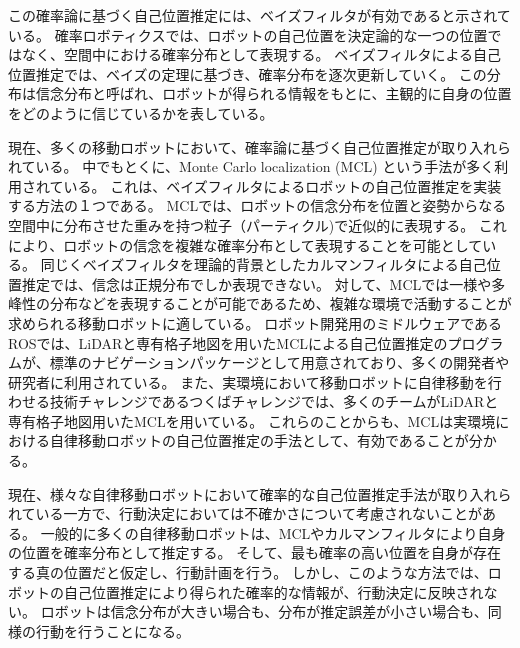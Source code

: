 この確率論に基づく自己位置推定には、ベイズフィルタが有効であると示されている。
確率ロボティクスでは、ロボットの自己位置を決定論的な一つの位置ではなく、空間中における確率分布として表現する。
ベイズフィルタによる自己位置推定では、ベイズの定理に基づき、確率分布を逐次更新していく。
この分布は信念分布と呼ばれ、ロボットが得られる情報をもとに、主観的に自身の位置をどのように信じているかを表している。

現在、多くの移動ロボットにおいて、確率論に基づく自己位置推定が取り入れられている。
中でもとくに、Monte Carlo localization (MCL) という手法が多く利用されている\cite{dellaert1999, fox1999}。
これは、ベイズフィルタによるロボットの自己位置推定を実装する方法の１つである。
MCLでは、ロボットの信念分布を位置と姿勢からなる空間中に分布させた重みを持つ粒子（パーティクル)で近似的に表現する。
これにより、ロボットの信念を複雑な確率分布として表現することを可能としている。
同じくベイズフィルタを理論的背景としたカルマンフィルタによる自己位置推定では、信念は正規分布でしか表現できない\cite{kalman1960}。
対して、MCLでは一様や多峰性の分布などを表現することが可能であるため、複雑な環境で活動することが求められる移動ロボットに適している。
ロボット開発用のミドルウェアであるROSでは、LiDARと専有格子地図を用いたMCLによる自己位置推定のプログラムが、標準のナビゲーションパッケージとして用意されており、多くの開発者や研究者に利用されている\cite{quigley2009ros,roswiki_amcl}。
また、実環境において移動ロボットに自律移動を行わせる技術チャレンジであるつくばチャレンジでは、多くのチームがLiDARと専有格子地図用いたMCLを用いている。
\cite{夏迫2016つくばチャレンジ}
これらのことからも、MCLは実環境における自律移動ロボットの自己位置推定の手法として、有効であることが分かる。

現在、様々な自律移動ロボットにおいて確率的な自己位置推定手法が取り入れられている一方で、行動決定においては不確かさについて考慮されないことがある。
一般的に多くの自律移動ロボットは、MCLやカルマンフィルタにより自身の位置を確率分布として推定する。
そして、最も確率の高い位置を自身が存在する真の位置だと仮定し、行動計画を行う。
しかし、このような方法では、ロボットの自己位置推定により得られた確率的な情報が、行動決定に反映されない。
ロボットは信念分布が大きい場合も、分布が推定誤差が小さい場合も、同様の行動を行うことになる。

